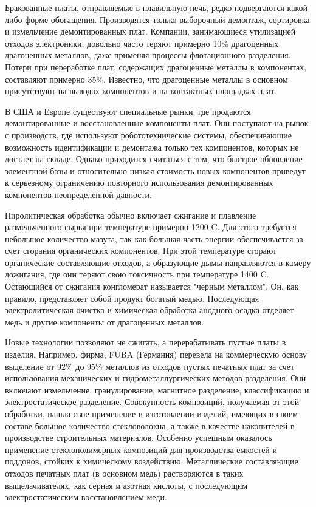 Бракованные платы, отправляемые в плавильную печь, редко подвергаются какой-либо форме обогащения. Производятся только выборочный демонтаж, сортировка и измельчение демонтированных плат. Компании, занимающиеся утилизацией отходов электроники, довольно часто теряют примерно 10\% драгоценных драгоценных металлов, даже применяя процессы флотационного разделения. Потери при переработке плат, содержащих драгоценные металлы в компонентах, составляют примерно 35\%. Известно, что драгоценные металлы в основном присутствуют на выводах компонентов и на контактных площадках плат.

В США и Европе существуют специальные рынки, где продаются демонтированные и восстановленные компоненты плат. Они поступают на рынок с производств, где используют робототехнические системы, обеспечивающие возможность идентификации и демонтажа только тех компонентов, которых не достает на складе. Однако приходится считаться с тем, что быстрое обновление элементной базы и относительно низкая стоимость новых компонентов приведут к серьезному ограничению повторного использования демонтированных компонентов неопределенной давности.

Пиролитическая обработка обычно включает сжигание и плавление размельченного сырья при температуре примерно 1200 \textdegree C. Для этого требуется небольшое количество мазута, так как большая часть энергии обеспечивается за счет сгорания органических компонентов. При этой температуре сгорают органические составляющие отходов, а образующие дымы направляются в камеру дожигания, где они теряют свою токсичность при температуре 1400 \textdegree C. Остающийся от сжигания конгломерат называется "черным металлом". Он, как правило, представляет собой продукт богатый медью. Последующая электролитическая очистка и химическая обработка анодного осадка отделяет медь и другие компоненты от драгоценных металлов.

Новые технологии позволяют не сжигать, а перерабатывать пустые платы в изделия. Например, фирма, FUBA (Германия) перевела на коммерческую основу выделение от 92\% до 95\% металлов из отходов пустых печатных плат за счет использования механических и гидрометаллургических методов разделения. Они включают измельчение, гранулирование, магнитное разделение, классификацию и электростатическое разделение. Совокупность композиций, получаемая от этой обработки, нашла свое применение в изготовлении изделий, имеющих в своем составе большое количество стекловолокна, а также в качестве накопителей в производстве строительных материалов. Особенно успешным оказалось применение стеклополимерных композиций для производства емкостей и поддонов, стойких к химическому воздействию. Металлические составляющие отходов печатных плат (в основном медь) растворяются в таких выщелачивателях, как серная и азотная кислоты, с последующим электростатическим восстановлением меди.

